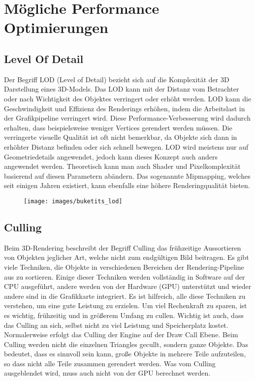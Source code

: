 \chapter{Mögliche Performance Optimierungen} \label{simon_performance}
\section{Level Of Detail}
Der Begriff LOD (Level of Detail) bezieht sich auf die Komplexität der 3D Darstellung eines 3D-Models. Das LOD kann mit der Distanz vom Betrachter oder nach Wichtigkeit des Objektes verringert oder erhöht werden. LOD kann die Geschwindigkeit und Effizienz des Renderings erhöhen, indem die Arbeitslast in der Grafikpipeline verringert wird. Diese Performance-Verbesserung wird dadurch erhalten, dass beispielsweise weniger Vertices gerendert werden müssen. Die verringerte visuelle Qualität ist oft nicht bemerkbar, da Objekte sich dann in erhöhter Distanz befinden oder sich schnell bewegen. LOD wird meistens nur auf Geometriedetails angewendet, jedoch kann dieses Konzept auch anders angewendet werden. Theoretisch kann man auch Shader und Pixelkomplexität basierend auf diesen Parametern abändern. Das sogenannte Mipmapping, welches seit einigen Jahren existiert, kann ebenfalls eine höhere Renderingqualität bieten.

\begin{figure}[h]
	\centering
	\texttt{[image: images/buketits\_lod]}
	\caption{\cite{_lod_formeshes}}
\end{figure}


\section{Culling}
Beim 3D-Rendering beschreibt der Begriff Culling das frühzeitige Aussortieren von Objekten jeglicher Art, welche nicht zum endgültigen Bild beitragen. Es gibt viele Techniken, die Objekte in verschiedenen Bereichen der Rendering-Pipeline aus zu sortieren. Einige dieser Techniken werden vollständig in Software auf der CPU ausgeführt, andere werden von der Hardware (GPU) unterstützt und wieder andere sind in die Grafikkarte integriert. Es ist hilfreich, alle diese Techniken zu verstehen, um eine gute Leistung zu erzielen. Um viel Rechenkraft zu sparen, ist es wichtig, frühzeitig und in größerem Umfang zu cullen. Wichtig ist auch, dass das Culling an sich, selbst nicht zu viel Leistung und Speicherplatz kostet.
Normalerweise erfolgt das Culling der Engine auf der Draw Call Ebene. Beim Culling werden nicht die einzelnen Triangles gecullt, sondern ganze Objekte. Das bedeutet, dass es sinnvoll sein kann, große Objekte in mehrere Teile aufzuteilen, so dass nicht alle Teile zusammen gerendert werden.
Was vom Culling ausgeblendet wird, muss auch nicht von der GPU berechnet werden.

